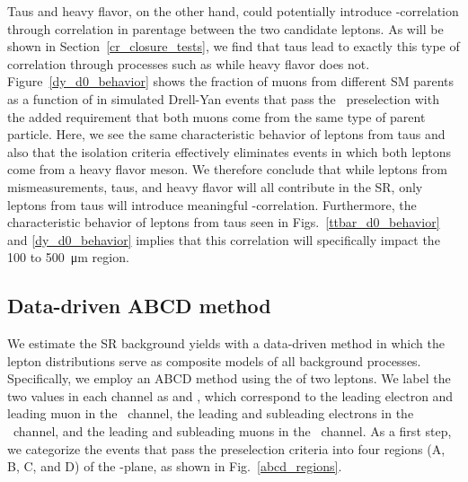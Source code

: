 Taus and heavy flavor, on the other hand, could potentially introduce \ad-\ad correlation through correlation in parentage between the two candidate leptons. As will be shown in Section~\ref{cr_closure_tests}, we find that taus lead to exactly this type of correlation through processes such as \ztautaull while heavy flavor does not. Figure~\ref{dy_d0_behavior} shows the fraction of muons from different SM parents as a function of \ad in simulated Drell-Yan events that pass the \Pgm\Pgm\ preselection with the added requirement that both muons come from the same type of parent particle. Here, we see the same characteristic \ad behavior of leptons from taus and also that the isolation criteria effectively eliminates events in which both leptons come from a heavy flavor meson. We therefore conclude that while leptons from mismeasurements, taus, and heavy flavor will all contribute in the SR, only leptons from taus will introduce meaningful \ad-\ad correlation. Furthermore, the characteristic \ad behavior of leptons from taus seen in Figs.~\ref{ttbar_d0_behavior} and \ref{dy_d0_behavior} implies that this correlation will specifically impact the \num{100} to \SI{500}{\um} region.



\subsection{Data-driven ABCD method}
\label{abcd}
We estimate the SR background yields with a data-driven method in which the lepton \ad distributions serve as composite models of all background processes. Specifically, we employ an ABCD method using the \ad of two leptons. We label the two \ad values in each channel as \ada and \adb, which correspond to the leading electron and leading muon in the \Pe\Pgm\ channel, the leading and subleading electrons in the \Pe\Pe\ channel, and the leading and subleading muons in the \Pgm\Pgm\ channel. As a first step, we categorize the events that pass the preselection criteria into four regions (A, B, C, and D) of the \ada-\adb plane, as shown in Fig.~\ref{abcd_regions}.



